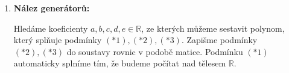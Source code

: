 \documentclass[12pt]{article}
\begin{document}
\begin{enumerate}
\begin{enumerate}
\begin{enumerate}
          který splňuje podmínky $(*1),(*2),(*3)$.
          \begin{align*}
            t\cdot P_1(x) &= t(a_1x^4+b_1x^3+c_1x^2+d_1x+e_1) = ta_1x^4+tb_1x^3+tc_1x^2+td_1x+te_1 \\
              &\text{Položme }a'=ta_1, b'=tb_1, c'=tc_1, d'=td_1, e'=te_1 \\
              &= a'x^4 + b'x^3 + c'x^2 + d'x + e' \\
              &\text{Vznikl polynom ve chtěném předpisu.} \\
            \text{Ověření podmínek:} \\
              &\bullet a,b,c,d,e\in\mathbb{R}\text{: Součinem realných čísel vznikne realné číslo,
                tím je podmínka pro $a',b',c',d',e'$ ověřena} \\
              &\bullet a+b+c+d+e=0: \\
                &\quad\quad a'+b'+c'+d'+e' = ta_1 + tb_1 + tc_1 + td_1 + te_1 = t(a_1+b_1+c_1+d_1+e_1) \overset{(*2)}{=} t\cdot0 = 0 \\
              &\bullet 5a+3b+c+d = 0 \\
                &\quad\quad 5a'+3b'+c'+d' = 5ta_1+3tb_1+tc_1+td_1 = t(5a_1+3b_1+c_1+d_1) \overset{(*3)}{=} t\cdot0 = 0 \\
          \end{align*}
          QED
      \end{enumerate}

    \item \textbf{Nález generátorů:}
    
      Hledáme koeficienty $a,b,c,d,e\in\mathbb{R}$, ze kterých můžeme sestavit polynom, který splňuje podmínky $(*1),(*2),(*3)$.
      Zapišme podmínky $(*2),(*3)$ do soustavy rovnic v podobě matice. Podmínku $(*1)$ automaticky splníme tím, že budeme počítat nad tělesem
      $\mathbb{R}$.


\end{enumerate}
\end{enumerate}
\end{document}
